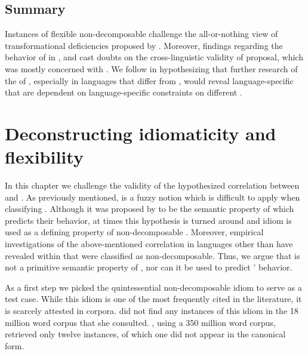 \documentclass[output=paper]{langsci/langscibook}
\begin{document}
\subsection{Summary}
Instances of flexible non-decomposable  challenge the
all-or-nothing view of transformational deficiencies proposed by \citet{nunberg94}. Mo\-reover, findings regarding the behavior of  in ,  and  cast doubts on the cross-linguistic validity of  proposal, which was mostly concerned with  . We follow \citet{bargmannsailer15} in hypothesizing that further research of the  of ,
especially in languages that differ from , would reveal
language-specific  that are dependent on language-specific
constraints on different .

\section{Deconstructing idiomaticity and flexibility}

In this chapter we challenge the validity of the hypothesized correlation between  and . As previously mentioned,  is a fuzzy notion which is difficult to apply when classifying . Although it was proposed by \citet{nunberg94} to be the semantic property of  which predicts their behavior, at times this hypothesis is turned around and idiom  is used as a defining property of non-decomposable . Moreover, empirical investigations of the above-mentioned correlation in languages other than  have revealed  within  that were classified as non-decomposable. Thus, we argue that  is not a primitive semantic property of , nor can it be used to predict ' behavior.

As a first step we picked the quintessential non-decomposable idiom  to serve as a test case. While this idiom is one of the most frequently cited  in the literature, it is scarcely attested in corpora. \citet{moon98} did not find any instances of this idiom in the 18 million word corpus that she consulted. \citet{riehemann01}, using a 350 million word corpus, retrieved only twelve instances, of which one did not appear in the canonical form.
\end{document}
